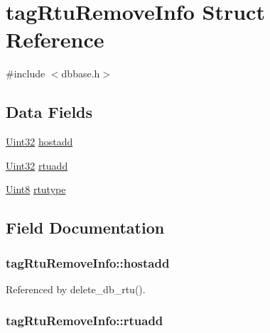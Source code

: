 \hypertarget{structtagRtuRemoveInfo}{\section{tag\-Rtu\-Remove\-Info Struct Reference}
\label{structtagRtuRemoveInfo}
}


{\ttfamily \#include $<$dbbase.\-h$>$}

\subsection*{Data Fields}
\begin{DoxyCompactItemize}
\item 
\hyperlink{base_8h_a60cf7b3c038ce37a50796e8eaddf0b5f}{Uint32} \hyperlink{structtagRtuRemoveInfo_a244c76985c66ca93a3e633adb12656dd}{hostadd}
\item 
\hyperlink{base_8h_a60cf7b3c038ce37a50796e8eaddf0b5f}{Uint32} \hyperlink{structtagRtuRemoveInfo_ac893b898bd3cc684fd800ab0e2570bca}{rtuadd}
\item 
\hyperlink{base_8h_af84840501dec18061d18a68c162a8fa2}{Uint8} \hyperlink{structtagRtuRemoveInfo_abbc90c436c58b5aff022f9351e00d60c}{rtutype}
\end{DoxyCompactItemize}


\subsection{Field Documentation}
\hypertarget{structtagRtuRemoveInfo_a244c76985c66ca93a3e633adb12656dd}{
\subsubsection[{hostadd}]{ tag\-Rtu\-Remove\-Info\-::hostadd}}\label{structtagRtuRemoveInfo_a244c76985c66ca93a3e633adb12656dd}


Referenced by delete\-\_\-db\-\_\-rtu().

\hypertarget{structtagRtuRemoveInfo_ac893b898bd3cc684fd800ab0e2570bca}{
\subsubsection[{rtuadd}]{ tag\-Rtu\-Remove\-Info\-::rtuadd}}\label{structtagRtuRemoveInfo_ac893b898bd3cc684fd800ab0e2570bca}


